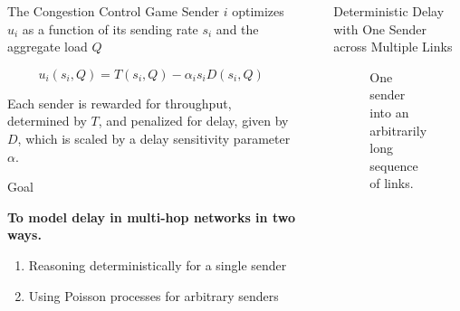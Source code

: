 \documentclass[final]{beamer}
\newlength{\sepwidth}
\newlength{\colwidth}
\newcommand{\separatorcolumn}{\begin{column}{\sepwidth}\end{column}}
\begin{document}
\begin{frame}[t]
\begin{columns}[t]
\begin{column}{\colwidth}
\begin{block}{The Congestion Control Game}
    Sender $i$ optimizes $u_i$ as a function of its sending rate $s_i$ and the
    aggregate load $Q$
    
    {\Large\[u_i(s_i, Q) = T(s_i, Q) - \alpha_i s_i D(s_i, Q) \]}

    Each sender is rewarded for throughput, determined by $T$, and penalized for
     delay, given by $D$, which is scaled by a delay sensitivity parameter $\alpha$.
  \end{block}

  \begin{block}{Goal}
    \begin{Large}
      
      \textbf{To model delay in multi-hop networks in two ways.}
      \begin{enumerate}
        \item Reasoning deterministically for a single sender
        \item Using Poisson processes for arbitrary senders
      \end{enumerate}
    \end{Large}

  \end{block}

\end{column}

\separatorcolumn

\begin{column}{\colwidth}

  \begin{block}{Deterministic Delay with One Sender across Multiple Links}
    \begin{figure}
      \centering
      \caption{One sender into an arbitrarily long sequence of links.}
    \end{figure}
      

\end{block}
\end{column}
\end{columns}
\end{frame}
\end{document}
